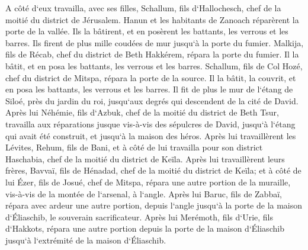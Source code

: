 \verse A côté d`eux travailla, avec ses filles, Schallum, fils d`Hallochesch, chef de la moitié du district de Jérusalem. 
\verse Hanun et les habitants de Zanoach réparèrent la porte de la vallée. Ils la bâtirent, et en posèrent les battants, les verrous et les barres. Ils firent de plus mille coudées de mur jusqu`à la porte du fumier. 
\verse Malkija, fils de Récab, chef du district de Beth Hakkérem, répara la porte du fumier. Il la bâtit, et en posa les battants, les verrous et les barres. 
\verse Schallum, fils de Col Hozé, chef du district de Mitspa, répara la porte de la source. Il la bâtit, la couvrit, et en posa les battants, les verrous et les barres. Il fit de plus le mur de l`étang de Siloé, près du jardin du roi, jusqu`aux degrés qui descendent de la cité de David. 
\verse Après lui Néhémie, fils d`Azbuk, chef de la moitié du district de Beth Tsur, travailla aux réparations jusque vis-à-vis des sépulcres de David, jusqu`à l`étang qui avait été construit, et jusqu`à la maison des héros. 
\verse Après lui travaillèrent les Lévites, Rehum, fils de Bani, et à côté de lui travailla pour son district Haschabia, chef de la moitié du district de Keïla. 
\verse Après lui travaillèrent leurs frères, Bavvaï, fils de Hénadad, chef de la moitié du district de Keïla; 
\verse et à côté de lui Ézer, fils de Josué, chef de Mitspa, répara une autre portion de la muraille, vis-à-vis de la montée de l`arsenal, à l`angle. 
\verse Après lui Baruc, fils de Zabbaï, répara avec ardeur une autre portion, depuis l`angle jusqu`à la porte de la maison d`Éliaschib, le souverain sacrificateur. 
\verse Après lui Merémoth, fils d`Urie, fils d`Hakkots, répara une autre portion depuis la porte de la maison d`Éliaschib jusqu`à l`extrémité de la maison d`Éliaschib. 
